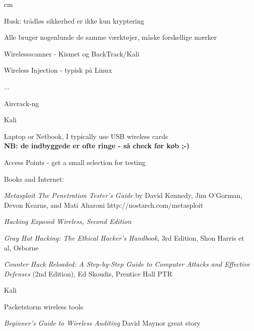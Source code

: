 \documentclass[20pt,landscape,a4paper,footrule]{foils}
\begin{document}
 cm

\centerline{\hlkbig Husk: trådløs sikkerhed er ikke kun kryptering}




\begin{list1}
\item Alle bruger nogenlunde de samme værktøjer, måske forskellige
  mærker
\begin{list2}
\item Wirelessscanner - Kismet og BackTrack/Kali
\item Wireless Injection - typisk på Linux
\item ...
\item Aircrack-ng
\end{list2}
\item Kali 
\end{list1}




\begin{list1}
\item Laptop or Netbook, I typically use USB wireless cards\\
{\bf NB: de indbyggede er ofte ringe - så check før køb ;-)}
\item Access Points - get a small selection for testing
\item Books and Internet:
\begin{list2}
\item \emph{Metasploit The Penetration Tester's Guide}
by David Kennedy, Jim O'Gorman, Devon Kearns, and Mati Aharoni
http://nostarch.com/metasploit
\item \emph{Hacking Exposed Wireless, Second Edition}
\item \emph{Gray Hat Hacking: The Ethical Hacker's Handbook}, 3rd Edition, Shon Harris et al, Osborne
\item \emph{Counter Hack Reloaded: A Step-by-Step Guide to Computer Attacks and Effective Defenses} (2nd Edition), Ed Skoudis, Prentice Hall PTR
\item Kali 
\item Packetstorm wireless tools
\item \emph{Beginner's Guide to Wireless Auditing}
David Maynor great story\\
\end{list2}
\end{list1}
\end{document}

